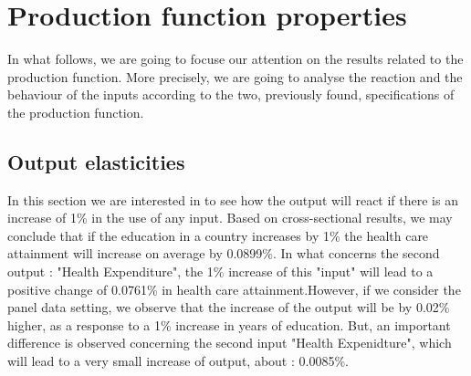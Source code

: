 \documentclass[12pt,a4paper]{article}\usepackage[]{graphicx}\usepackage[]{color}
\begin{document}
\section{Production function properties}
In what follows, we are going to focuse our attention on the results related to the production function. More precisely, we are going to analyse the reaction and the behaviour of the inputs according to the two, previously found, specifications of the production function. 

\subsection{Output elasticities}
In this section we are interested in to see how the output will react if there is an increase of 1\% in the use of any input. Based on cross-sectional results, we may conclude that if the education in a country increases by 1\% the health care attainment will increase on average by 0.0899\%. In what concerns the second output : "Health Expenditure", the 1\% increase of this "input" will lead to a positive change of 0.0761\% in health care attainment.However, if we consider the panel data setting, we observe that the increase of the output will be by 0.02\% higher, as a response to a 1\% increase in years of education. But, an important difference is observed concerning the second input "Health Expenidture", which will lead to a very small increase of output, about : 0.0085\%.
\end{document}
